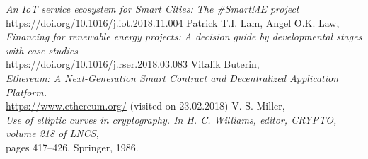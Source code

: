 \documentclass[11pt]{article}
\begin{document}
\begin{thebibliography}{22}
	\textit{An IoT service ecosystem for Smart Cities: The \#SmartME project}\\
	\hyperref[https://doi.org/10.1016/j.iot.2018.11.004]{https://doi.org/10.1016/j.iot.2018.11.004}
	Patrick T.I. Lam, Angel O.K. Law, \\
	\textit{Financing for renewable energy projects: A decision guide by developmental stages with case studies}\\
	\hyperref[https://doi.org/10.1016/j.rser.2018.03.083]{https://doi.org/10.1016/j.rser.2018.03.083}
	Vitalik Buterin, \\
	\textit{Ethereum: A Next-Generation Smart
Contract and Decentralized Application Platform.}\\
	\hyperref[https://www.ethereum.org/]{https://www.ethereum.org/}  (visited on 23.02.2018)
	V. S. Miller, \\
	\textit{Use of elliptic curves in cryptography. In H. C. Williams, editor, CRYPTO, volume 218 of
LNCS,}\\
	  pages 417–426. Springer, 1986.




\end{thebibliography}
\end{document}
